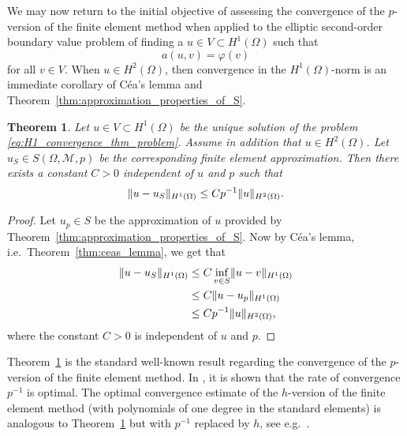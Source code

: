 \documentclass[english, 12pt, a4paper, sci, utf8, a-2b, online]{aaltothesis}
\theoremstyle{definition}
\theoremstyle{plain}
\newtheorem{theorem}{Theorem}[section]
\DeclarePairedDelimiter\norm{\lVert}{\rVert}
\numberwithin{equation}{section}
\begin{document}
We may now return to the initial objective of assessing the convergence
of the $p$-version of the finite element method when applied to the
elliptic second-order boundary value problem of finding a
$u \in V \subset H^1(\Omega)$ such that
\begin{equation}
    \label{eq:H1_convergence_thm_problem}
    a(u,v) = \varphi(v)
\end{equation}
for all $v \in V$. When $u \in H^2(\Omega)$, then convergence
in the $H^1(\Omega)$-norm is an immediate corollary of Céa's lemma
and Theorem~\ref{thm:approximation_properties_of_S}.
\begin{theorem}
    \label{thm:H1_convergence_of_p_version}
    Let $u \in V \subset H^1(\Omega)$ be the unique solution of the problem 
    \eqref{eq:H1_convergence_thm_problem}.
    Assume in addition that $u \in H^2(\Omega)$.
    Let $u_S \in S(\Omega, \mathcal{M}, p)$ be the corresponding
    finite element approximation. Then there exists a constant $C > 0$
    independent of $u$ and $p$ such that
    \begin{equation*}
        \norm{u-u_S}_{H^1(\Omega)} \leq C p^{-1} \norm{u}_{H^2(\Omega)}.
    \end{equation*}
\end{theorem}
\begin{proof}
    Let $u_p \in S$ be the approximation of $u$ provided by
    Theorem~\ref{thm:approximation_properties_of_S}.
    Now by Céa's lemma, i.e.\ Theorem~\ref{thm:ceas_lemma}, we get that
    \begin{align*}
        \norm{u - u_S}_{H^1(\Omega)}
        &\leq C \inf_{v \in S} \norm{u - v}_{H^1(\Omega)} \\
        &\leq C \norm{u - u_p}_{H^1(\Omega)} \\
        &\leq C p^{-1} \norm{u}_{H^2(\Omega)},
    \end{align*}
    where the constant $C > 0$ is independent of $u$ and $p$.
\end{proof}

Theorem~\ref{thm:H1_convergence_of_p_version} is the standard
well-known result regarding the convergence of the $p$-version
of the finite element method. In \cite{babuskasuri1987},
it is shown that the rate of convergence $p^{-1}$ is optimal.
The optimal convergence estimate of the $h$-version of the finite element method
(with polynomials of one degree in the standard elements)
is analogous to Theorem~\ref{thm:H1_convergence_of_p_version}
but with $p^{-1}$ replaced by $h$, see e.g.\ \cite{braess2007}.
\end{document}
